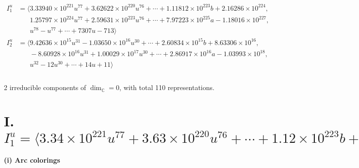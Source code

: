 \documentclass[1p]{elsarticle_modified}
\theoremstyle{definition}
\begin{document}
\begin{align*}
I^u_{1}&=\langle 
3.33940\times10^{221} u^{77}+3.62622\times10^{220} u^{76}+\cdots+1.11812\times10^{223} b+2.16286\times10^{224},\\
\phantom{I^u_{1}}&\phantom{= \langle  }1.25797\times10^{224} u^{77}+2.59631\times10^{223} u^{76}+\cdots+7.97223\times10^{225} a-1.18016\times10^{227},\\
\phantom{I^u_{1}}&\phantom{= \langle  }u^{78}- u^{77}+\cdots+7307 u-713\rangle \\
I^u_{2}&=\langle 
9.42636\times10^{15} u^{31}-1.03650\times10^{16} u^{30}+\cdots+2.60834\times10^{15} b+8.63306\times10^{16},\\
\phantom{I^u_{2}}&\phantom{= \langle  }-8.60928\times10^{16} u^{31}+1.00029\times10^{17} u^{30}+\cdots+2.86917\times10^{16} a-1.03993\times10^{18},\\
\phantom{I^u_{2}}&\phantom{= \langle  }u^{32}-12 u^{30}+\cdots+14 u+11\rangle \\
\\
\end{align*}
\raggedright * 2 irreducible components of $\dim_{\mathbb{C}}=0$, with total 110 representations.\\
\newpage
\renewcommand{\arraystretch}{1}
\centering \section*{I. $I^u_{1}= \langle 3.34\times10^{221} u^{77}+3.63\times10^{220} u^{76}+\cdots+1.12\times10^{223} b+2.16\times10^{224},\;1.26\times10^{224} u^{77}+2.60\times10^{223} u^{76}+\cdots+7.97\times10^{225} a-1.18\times10^{227},\;u^{78}- u^{77}+\cdots+7307 u-713 \rangle$}
\flushleft \textbf{(i) Arc colorings}\\
\end{document}
